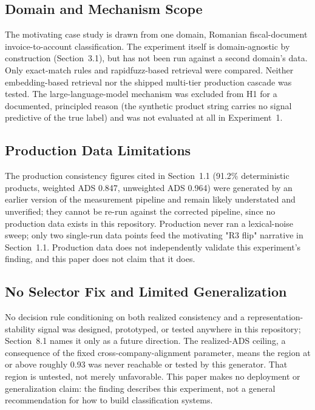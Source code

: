 \documentclass[11pt]{article}
\begin{document}
\subsection{Domain and Mechanism Scope}
\label{sec:domain-mechanism-scope}

The motivating case study is drawn from one domain, Romanian fiscal-document
invoice-to-account classification. The experiment itself is domain-agnostic
by construction (Section~3.1), but has not been run against a second
domain's data. Only exact-match rules and rapidfuzz-based retrieval were
compared. Neither embedding-based retrieval nor the shipped multi-tier
production cascade was tested. The large-language-model mechanism was excluded from H1
for a documented, principled reason (the synthetic product string carries
no signal predictive of the true label) and was not evaluated at all in
Experiment~1.

\subsection{Production Data Limitations}
\label{sec:limits-production-data}

The production consistency figures cited in Section~1.1 (91.2\% deterministic
products, weighted ADS 0.847, unweighted ADS 0.964) were generated by an
earlier version of the measurement pipeline and remain likely understated and
unverified; they cannot be re-run against the corrected pipeline, since no
production data exists in this repository. Production never ran a
lexical-noise sweep; only two single-run data points feed the motivating
"R3 flip" narrative in Section~1.1. Production data does not independently
validate this experiment's finding, and this paper does not claim that it
does.

\subsection{No Selector Fix and Limited Generalization}
\label{sec:limits-no-selector-fix}

No decision rule conditioning on both realized consistency and a
representation-stability signal was designed, prototyped, or tested anywhere
in this repository; Section~8.1 names it only as a future direction. The
realized-ADS ceiling, a consequence of the fixed
cross-company-alignment parameter, means the region at or above roughly 0.93
was never reachable or tested by this generator. That region is untested, not merely unfavorable. This paper makes no deployment or generalization claim: the
finding describes this experiment, not a general recommendation for how to
build classification systems.
\end{document}
